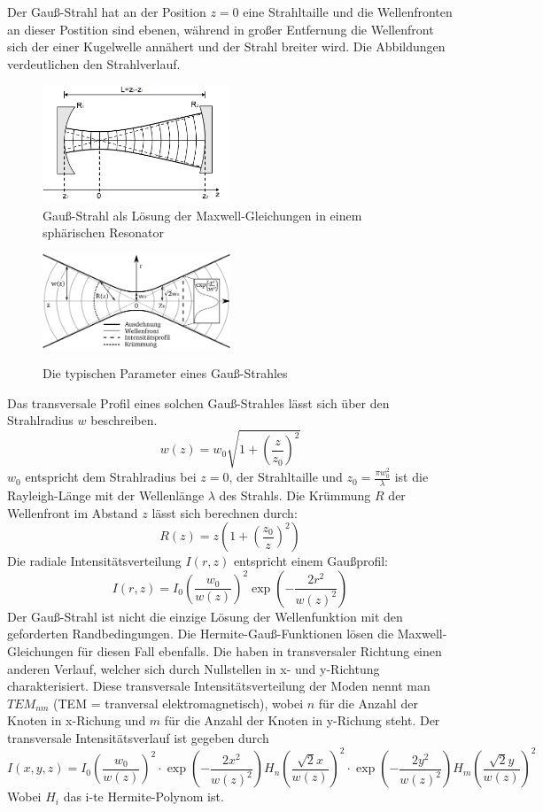 \documentclass[bigchapter,colorback,accentcolor=tud4b,linedtoc,11pt]{tudreport}
\numberwithin{equation}{subsection}
\begin{document}
Der Gauß-Strahl hat an der Position \(z=0\) eine Strahltaille und die Wellenfronten an dieser Postition sind ebenen, während in großer Entfernung die Wellenfront sich der einer Kugelwelle annähert und der Strahl breiter wird. Die Abbildungen verdeutlichen den Strahlverlauf.

\begin{figure}[h]
	\centering
		\includegraphics[width=0.5\textwidth]{img/gauss_res.png}
	\caption{Gauß-Strahl als Lösung der Maxwell-Gleichungen in einem sphärischen Resonator}
\end{figure}
\begin{figure}[h]
	\centering
		\includegraphics[width=0.5\textwidth]{img/gauss_param.png}
	\caption{Die typischen Parameter eines Gauß-Strahles}
\cite{GSParamater}
\end{figure}
\FloatBarrier

Das transversale Profil eines solchen Gauß-Strahles lässt sich über den Strahlradius $w$ beschreiben.
$$w(z) = w_0 \sqrt{1+\left(\frac{z}{z_0}\right)^2}$$
$w_0$ entspricht dem Strahlradius bei $z=0$, der Strahltaille und $z_0 = \frac{\pi w_0^2}{\lambda}$ ist die Rayleigh-Länge mit der Wellenlänge $\lambda$ des Strahls.
Die Krümmung $R$ der Wellenfront im Abstand $z$ lässt sich berechnen durch:
$$R(z) = z \left(1+\left(\frac{z_0}{z}\right)^2\right)$$
Die radiale Intensitätsverteilung $I(r,z)$ entspricht einem Gaußprofil:
$$ I(r,z) = I_0 \left(\frac{w_0}{w(z)}\right)^2 \exp\left(-\frac{2r^2}{w(z)^2}\right)  $$
Der Gauß-Strahl ist nicht die einzige Lösung der Wellenfunktion mit den geforderten Randbedingungen. Die Hermite-Gauß-Funktionen lösen die Maxwell-Gleichungen für diesen Fall ebenfalls. Die haben in transversaler Richtung einen anderen Verlauf, welcher sich durch Nullstellen in x- und y-Richtung charakterisiert. Diese transversale Intensitätsverteilung der Moden nennt man $TEM_{nm}$ (TEM = tranversal elektromagnetisch), wobei $n$ für die Anzahl der Knoten in x-Richung und $m$ für die Anzahl der Knoten in y-Richung steht.
Der transversale Intensitätsverlauf ist gegeben durch
$$I(x,y, z) = I_0 \left(\frac{w_0}{w(z)}\right)^2 \cdot \exp\left(-\frac{2 x^2}{w(z)^2}\right) H_n\left(\frac{\sqrt{2}x}{w(z)}\right)^2 \cdot \exp\left(-\frac{2 y^2}{w(z)^2}\right) H_m\left(\frac{\sqrt{2}y}{w(z)}\right)^2$$
Wobei $H_i$ das i-te Hermite-Polynom ist.
\end{document}
